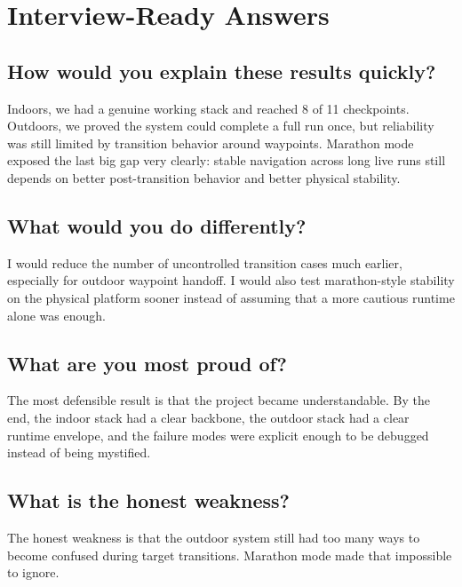 \documentclass[11pt]{article}
\begin{document}
\section{Interview-Ready Answers}

\subsection*{How would you explain these results quickly?}

Indoors, we had a genuine working stack and reached 8 of 11 checkpoints. Outdoors,
we proved the system could complete a full run once, but reliability was still
limited by transition behavior around waypoints. Marathon mode exposed the last big
gap very clearly: stable navigation across long live runs still depends on better
post-transition behavior and better physical stability.

\subsection*{What would you do differently?}

I would reduce the number of uncontrolled transition cases much earlier, especially
for outdoor waypoint handoff. I would also test marathon-style stability on the
physical platform sooner instead of assuming that a more cautious runtime alone was
enough.

\subsection*{What are you most proud of?}

The most defensible result is that the project became understandable. By the end,
the indoor stack had a clear backbone, the outdoor stack had a clear runtime
envelope, and the failure modes were explicit enough to be debugged instead of
being mystified.

\subsection*{What is the honest weakness?}

The honest weakness is that the outdoor system still had too many ways to become
confused during target transitions. Marathon mode made that impossible to ignore.
\end{document}
